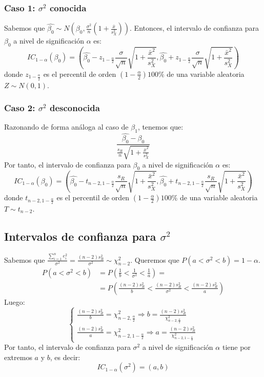 \subsubsection*{Caso 1: $\sigma^2$ conocida}
Sabemos que $\hat{\beta_0} \sim N\left( \beta_0, \frac{\sigma^2}{n} \left( 1 + \frac{\bar{x}}{s_X^2} \right) \right)$.
Entonces, el intervalo de confianza para $\beta_0$ a nivel de significación $\alpha$ es:
$$IC_{1-\alpha}(\beta_0) = \left( \hat{\beta_0} - z_{1-\frac{\alpha}{2}} \frac{\sigma}{\sqrt{n}} \sqrt{1 + \frac{\bar{x}^2}{s_X^2}}, \hat{\beta_0} + z_{1-\frac{\alpha}{2}} \frac{\sigma}{\sqrt{n}} \sqrt{1 + \frac{\bar{x}^2}{s_X^2}} \right)$$
donde $z_{1-\frac{\alpha}{2}}$ es el percentil de orden $(1 - \frac{\alpha}{2}) 100\%$ de una variable aleatoria $Z \sim N(0, 1)$.

\subsubsection*{Caso 2: $\sigma^2$ desconocida}
Razonando de forma análoga al caso de $\beta_1$, tenemos que:
$$\frac{\hat{\beta_0} - \beta_0}{\frac{s_R}{n} \sqrt{1 + \frac{\bar{x}^2}{s_X^2}}}$$
Por tanto, el intervalo de confianza para $\beta_0$ a nivel de significación $\alpha$ es:
$$IC_{1-\alpha}(\beta_0) = \left( \hat{\beta_0} - t_{n-2, 1-\frac{\alpha}{2}} \frac{s_R}{\sqrt{n}} \sqrt{1 + \frac{\bar{x}^2}{s_X^2}}, \hat{\beta_0} + t_{n-2, 1-\frac{\alpha}{2}} \frac{s_R}{\sqrt{n}} \sqrt{1 + \frac{\bar{x}^2}{s_X^2}} \right)$$
donde $t_{n-2, 1-\frac{\alpha}{2}}$ es el percentil de orden $(1 - \frac{\alpha}{2}) 100\%$ de una variable aleatoria $T \sim t_{n-2}$.

\subsection*{Intervalos de confianza para $\sigma^2$}
Sabemos que $\frac{\sum_{i=1}^n e_i^2}{\sigma^2} = \frac{(n-2)s_R^2}{\sigma^2} \sim \chi^2_{n-2}$.
Queremos que $P(a < \sigma^2 < b) = 1-\alpha$.
\begin{align*}
    P(a < \sigma^2 < b) & = P\left( \frac{1}{b} < \frac{1}{\sigma^2} < \frac{1}{a} \right) =                          \\
                        & = P\left( \frac{(n-2)s_R^2}{b} < \frac{(n-2)s_R^2}{\sigma^2} < \frac{(n-2)s_R^2}{a} \right)
\end{align*}
Luego:
$$\begin{cases}
        \frac{(n-2)s_R^2}{b} = \chi^2_{n-2, \frac{\alpha}{2}} \Rightarrow b = \frac{(n-2)s_R^2}{\chi^2_{n-2, \frac{\alpha}{2}}} \\
        \frac{(n-2)s_R^2}{a} = \chi^2_{n-2, 1 - \frac{\alpha}{2}} \Rightarrow a = \frac{(n-2)s_R^2}{\chi^2_{n-2, 1 - \frac{\alpha}{2}}}
    \end{cases}$$
Por tanto, el intervalo de confianza para $\sigma^2$ a nivel de significación $\alpha$ tiene por extremos $a$ y $b$, es decir:
$$IC_{1-\alpha}(\sigma^2) = (a, b)$$

